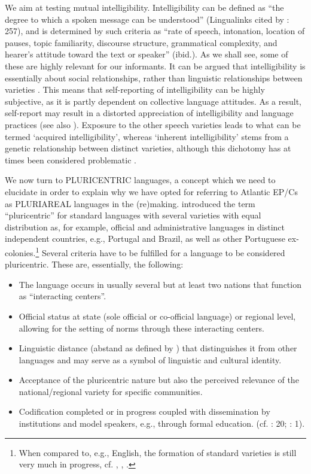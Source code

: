 \documentclass[output=paper,colorlinks,citecolor=brown]{langscibook}
\begin{document}
We aim at testing mutual intelligibility. Intelligibility can be defined as “the degree to which a spoken message can be understood” (Lingualinks cited by \cite{Bouwer_2007}: 257), and is determined by such criteria as “rate of speech, intonation, location of pauses, topic familiarity, discourse structure, grammatical complexity, and hearer’s attitude toward the text or speaker” (ibid.). As we shall see, some of these are highly relevant for our informants. It can be argued that intelligibility is essentially about social relationships, rather than linguistic relationships between varieties \citep[14]{Romaine_1994}. This means that self-reporting of intelligibility can be highly subjective, as it is partly dependent on collective language attitudes. As a result, self-report may result in a distorted appreciation of intelligibility and language practices (see also ). Exposure to the other speech varieties leads to what can be termed `acquired intelligibility', whereas `inherent intelligibility' stems from a genetic relationship between distinct varieties, although this dichotomy has at times been considered problematic \citep[257--258]{Bouwer_2007}.

We now turn to PLURICENTRIC languages, a concept which we need to elucidate in order to explain why we have opted for referring to Atlantic EP/Cs as PLURIAREAL languages \citep{Scheuringer_1996} in the (re)making. \citet[e.g.,][66]{Kloss_1978} introduced the term “pluricentric” for standard languages with several varieties with equal distribution as, for example, official and administrative languages in distinct independent countries, e.g., Portugal and Brazil, as well as other Portuguese ex-colonies.\footnote{When compared to, e.g., English, the formation of standard varieties is still very much in progress, cf. \citet{Buque_etal_2008}, \citet{Sobrinho_2009}, \citet{Goncalves_2013}.} Several criteria have to be fulfilled for a language to be considered pluricentric. These are, essentially, the following: 

\begin{itemize}
\item The language occurs in usually several but at least two nations that function as “interacting centers”.
\item Official status at state (sole official or co-official language) or regional level, allowing for the setting of norms through these interacting centers.
\item Linguistic distance (abstand as defined by \cite{Kloss_1967}) that distinguishes it from other languages and may serve as a symbol of linguistic and cultural identity.
\item Acceptance of the pluricentric nature but also the perceived relevance of the 	national/regional variety for specific communities.
\item Codification completed or in progress coupled with dissemination by institutions and model speakers, e.g., through formal education. (cf. \cite{Muhr_2012}: 20; \cite{Clyne_1992}: 1).
\end{itemize}
\end{document}
